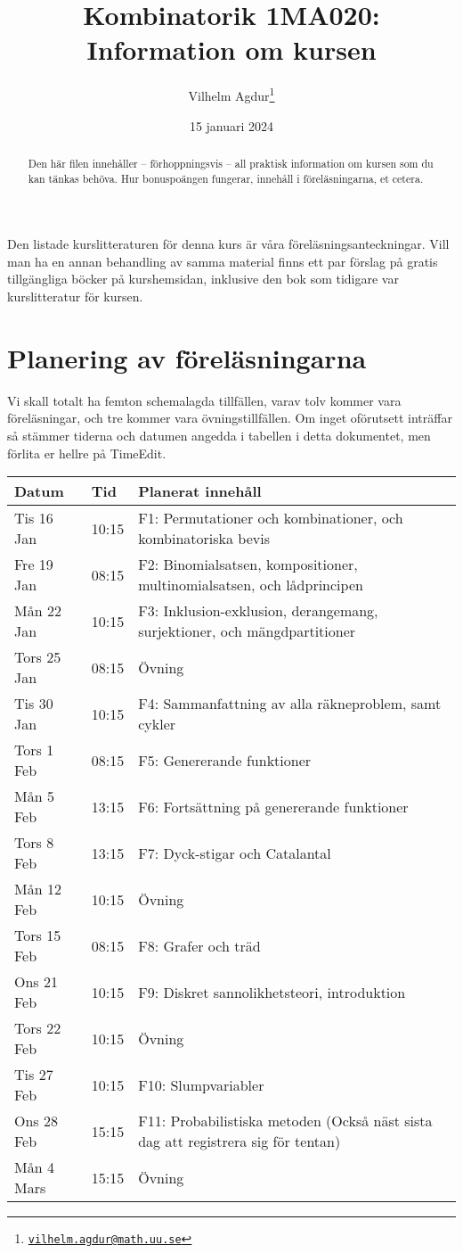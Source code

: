 \documentclass[nobib]{tufte-handout}
\title{Kombinatorik 1MA020: Information om kursen}
\author[Vilhelm Agdur]{Vilhelm Agdur\thanks{\href{mailto:vilhelm.agdur@math.uu.se}{\nolinkurl{vilhelm.agdur@math.uu.se}}}}
\date{15 januari 2024}
\begin{document}
\maketitle%

\begin{abstract}
\noindent
Den här filen innehåller -- förhoppningsvis -- all praktisk information om kursen som du kan tänkas behöva. Hur bonuspoängen fungerar, innehåll
i föreläsningarna, et cetera. 
\end{abstract}

Den listade kurslitteraturen för denna kurs är våra föreläsningsanteckningar. Vill man ha en annan behandling av samma material finns ett par förslag på gratis tillgängliga böcker på kurshemsidan, inklusive den bok som tidigare var kurslitteratur för kursen.

\section{Planering av föreläsningarna}

Vi skall totalt ha femton schemalagda tillfällen, varav tolv kommer vara föreläsningar, och tre kommer vara övningstillfällen. Om inget oförutsett inträffar så stämmer tiderna och datumen angedda i tabellen i detta dokumentet, men förlita er hellre på TimeEdit.

\begin{table}[h]
\begin{tabularx}{\textwidth}{llX}
Datum & Tid      & Planerat innehåll \\ 
\midrule
Tis 16 Jan &10:15 & F1: Permutationer och kombinationer, och kombinatoriska bevis\\
Fre 19 Jan &08:15 & F2: Binomialsatsen, kompositioner, multinomialsatsen, och lådprincipen\\
Mån 22 Jan &10:15 & F3: Inklusion-exklusion, derangemang, surjektioner, och mängdpartitioner\\
Tors 25 Jan &08:15 & Övning\\
Tis 30 Jan &10:15 & F4: Sammanfattning av alla räkneproblem, samt cykler\\
Tors 1 Feb &08:15 & F5: Genererande funktioner\\
Mån 5 Feb &13:15 & F6: Fortsättning på genererande funktioner\\
Tors 8 Feb &13:15 & F7: Dyck-stigar och Catalantal\\
Mån 12 Feb &10:15 & Övning\\
Tors 15 Feb &08:15 & F8: Grafer och träd\\
Ons 21 Feb &10:15 & F9: Diskret sannolikhetsteori, introduktion\\
Tors 22 Feb &10:15 & Övning\\
Tis 27 Feb &10:15 & F10: Slumpvariabler\\
Ons 28 Feb &15:15 & F11: Probabilistiska metoden (Också näst sista dag att registrera sig för tentan)\\
Mån 4 Mars &15:15 & Övning
\end{tabularx}
\end{table}
\end{document}
